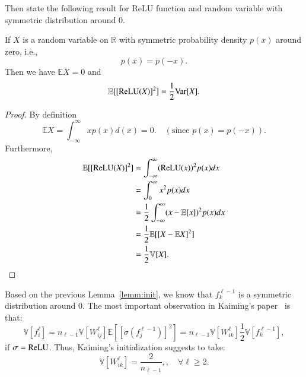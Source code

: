 Then state the following result for ReLU function and random variable with 
symmetric distribution around $0$.
\begin{lemma}
If $X$ is a random variable on $\mathbb{R}$ with symmetric probability density $p(x)$ around zero, i.e., 
\begin{equation}\label{key}
p(x) = p(-x).
\end{equation}
Then we have $\mathbb{E} X = 0$ and 
\begin{equation}\label{key}
\mathbb{E}[[{\rm ReLU}(X)]^2] = \frac{1}{2}{\rm Var}[X].
\end{equation}
\end{lemma}
\begin{proof}
	By definition
	\begin{equation}\label{key}
	\mathbb{E} X = \int_{-\infty}^\infty xp(x)d(x) = 0. \quad (\text{since } p(x) = p(-x)).
	\end{equation}
	Furthermore, 
	\begin{equation}\label{key}
	\begin{aligned}
	\mathbb{E}[[{\rm ReLU}(X)]^2] &= \int_{-\infty}^\infty ({\rm ReLU}(x))^2 p(x)  dx \\
	&= \int_{0}^\infty x^2 p(x) dx \\
	&= \frac{1}{2} \int_{-\infty}^\infty (x - \mathbb E [x])^{2} p(x) dx \\
	& = \frac{1}{2} \mathbb E[ [X - \mathbb{E} X]^2] \\
	& = \frac{1}{2}\mathbb{V}[X].
	\end{aligned}
	\end{equation}
\end{proof}



Based on the previous Lemma~\ref{lemm:init}, we know that $f^{\ell-1}_k$ is a symmetric distribution around $0$.
The most important observation in Kaiming's paper~\cite{he2015delving} is that:
\begin{equation*}\label{key}
\mathbb{V}[ f^\ell_i ] = n_{\ell-1}  \mathbb{V}[W^\ell_{ij}] {\mathbb{E}[[\sigma(f^{\ell-1}_j)]^2]} = n_{\ell-1} \mathbb{V}[W^\ell_{ik}] {\frac{1}{2} \mathbb{V}[f^{\ell-1}_k]},
\end{equation*}
{if $\sigma = {\rm ReLU}$}.
Thus, Kaiming's initialization suggests to take:
\begin{equation}\label{key}
\mathbb{V}[W^\ell_{ik}] = \frac{2}{n_{\ell-1}}, , \quad \forall \ell \ge 2.
\end{equation}

